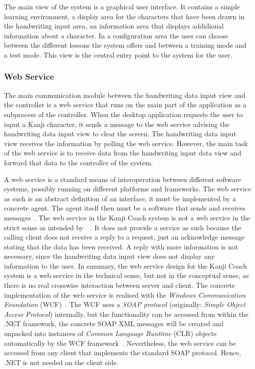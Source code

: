 The main view of the system is a graphical user interface. It contains 
a simple learning environment, a display area for the characters that have 
been drawn in the handwriting input area, an information area that displays 
addidional information about a character. In a configuration area the user can 
choose between the different lessons the system offers and between a training 
mode and a test mode. This view is the central entry point to the system for
the user.

\subsubsection{Web Service}
\label{sec:arch:webservice}

The main communication module between the handwriting data input view and the 
controller is a web service that runs on the main part of the application
as a subprocess of the controller. When the desktop application requests the 
user to input a Kanji character, it sends a message to the web service 
advising the handwriting data input view to clear the screen. 
The handwriting data input view receives the information by polling the 
web service. However, the main task of the web service is to receive data 
from the handwriting input data view and forward that data to the controller
of the system. 

A web service is a standard means of interoperation between different software
systems, possibly running on different platforms and frameworks. The web service
as such is an abstract definition of an interface, it must be implemented by a 
concrete agent. The agent itself then must be a software that sends and receives 
messages~.
The web service in the Kanji Coach system is not a web service in the strict 
sense as intended by~~\citeyear{W3C2004}. It does not 
provide a service as such because the calling client does not receive a reply 
to a request, just an acknowledge message stating that the data has been 
received. 
A reply with more information is not necessary, since the handwriting data 
input view does not display any information to the user. 
In summary, the web service design for the Kanji Coach system is a web service
in the technical sense, but not in the conceptual sense, as there is no real
crosswise interaction between server and client.
The concrete implementation of the web service is realised with the
\emph{Windows Communication Foundation} (WCF)~.
The WCF uses a \emph{SOAP protocol} (originally: 
\emph{Simple Object Access Protocol}) internally, but the functionality can be 
accessed from within the .NET framework, the concrete SOAP XML messages will 
be created and unpacked into instances of \emph{Common Language Runtime} (CLR) 
objects automatically by the WCF 
framework~.
Nevertheless, the web service can be accessed from any client that implements
the standard SOAP protocol. Hence, .NET is not needed on the client side.

